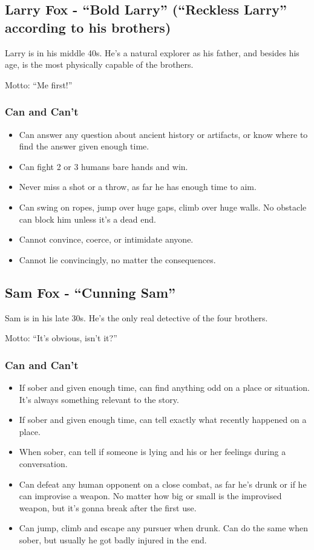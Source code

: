 \documentclass[11pt]{article}
\begin{document}
\subsection{Larry Fox - \enquote{Bold Larry} (\enquote{Reckless Larry} according to his brothers)}
\label{sec:larry}
Larry is in his middle 40s. He's a natural explorer as his father, and besides his age, is the most physically capable of the brothers.

Motto: \enquote{Me first!}

\subsubsection{Can and Can't}
\label{sec:org9c9803a}
\begin{itemize}
\item Can answer any question about ancient history or artifacts, or know where to find the answer given enough time.
\item Can fight 2 or 3 humans bare hands and win.
\item Never miss a shot or a throw, as far he has enough time to aim.
\item Can swing on ropes, jump over huge gaps, climb over huge walls. No obstacle can block him unless it's a dead end.
\item Cannot convince, coerce, or intimidate anyone.
\item Cannot lie convincingly, no matter the consequences.
\end{itemize}

\subsection{Sam Fox - \enquote{Cunning Sam}}
\label{sec:orgc38bb3d}
Sam is in his late 30s. He's the only real detective of the four brothers.

Motto: \enquote{It's obvious, isn't it?}

\subsubsection{Can and Can't}
\label{sec:orge2ce8a5}
\begin{itemize}
\item If sober and given enough time, can find anything odd on a place or situation. It's always something relevant to the story.
\item If sober and given enough time, can tell exactly what recently happened on a place.
\item When sober, can tell if someone is lying and his or her feelings during a conversation.
\item Can defeat any human opponent on a close combat, as far he's drunk or if he can improvise a weapon. No matter how big or small is the improvised weapon, but it's gonna break after the first use.
\item Can jump, climb and escape any pursuer when drunk. Can do the same when sober, but usually he got badly injured in the end.
\end{itemize}
\end{document}
